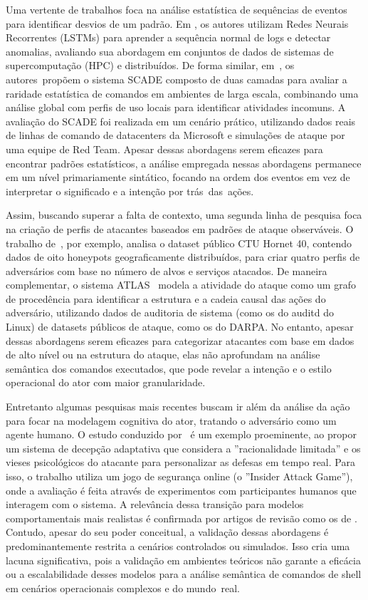 \documentclass[12pt]{article}
\begin{document}
Uma vertente de trabalhos foca na análise estatística de sequências de eventos para identificar desvios de um padrão. Em \cite{du2017deeplog}, os autores utilizam Redes Neurais Recorrentes (LSTMs) para aprender a sequência normal de logs e detectar anomalias, avaliando sua abordagem em conjuntos de dados de sistemas de supercomputação (HPC) e distribuídos. De forma similar, em~\cite{vinay2024scade}, os autores~propõem  o sistema SCADE composto de duas camadas para avaliar a raridade estatística de comandos em ambientes de larga escala, combinando uma análise global com perfis de uso locais para identificar atividades incomuns. 
A avaliação do SCADE foi realizada em um cenário prático, utilizando dados reais de linhas de comando de datacenters da Microsoft e simulações de ataque por uma equipe de Red Team. Apesar dessas abordagens serem eficazes para encontrar padrões estatísticos,  a análise empregada nessas abordagens permanece em um nível primariamente sintático, focando na ordem dos eventos em vez de interpretar o significado e a intenção por trás~das~ações.

Assim, buscando  superar a falta de contexto, uma segunda linha de pesquisa foca na criação de perfis de atacantes baseados em padrões de ataque observáveis. O trabalho de~\cite{veronica2023geo}, por exemplo, analisa o dataset público CTU Hornet 40, contendo dados de oito honeypots geograficamente distribuídos, para criar quatro perfis de adversários com base no número de alvos e serviços atacados. De maneira complementar, o sistema ATLAS~\cite{lashkari2022atlas} modela a atividade do ataque como um grafo de procedência para identificar a estrutura e a cadeia causal das ações do adversário, utilizando dados de auditoria de sistema (como os do auditd do Linux) de datasets públicos de ataque, como os do DARPA. 
No entanto, apesar dessas abordagens serem eficazes para categorizar atacantes com base em dados de alto nível ou na estrutura do ataque, elas não aprofundam na análise semântica dos comandos executados, que pode revelar a intenção e o estilo operacional do ator com maior granularidade.

Entretanto algumas pesquisas mais recentes buscam ir além da análise da ação para focar na modelagem cognitiva do ator, tratando o adversário como um agente humano. O estudo conduzido por~\cite{cranford2020adaptive} é um exemplo proeminente, ao propor um sistema de decepção adaptativa que considera a ''racionalidade limitada'' e os vieses psicológicos do atacante para personalizar as defesas em tempo real. Para isso, o trabalho utiliza um jogo de segurança online (o ''Insider Attack Game''), onde a avaliação é feita através de experimentos com participantes humanos que interagem com o sistema. A relevância dessa transição para modelos comportamentais mais realistas é confirmada por artigos de revisão como os de \cite{zhu2021defensive, jurisic2023behaviour}. Contudo, apesar do seu poder conceitual, a validação dessas abordagens é predominantemente restrita a cenários controlados ou simulados. Isso cria uma lacuna significativa, pois a validação em ambientes teóricos não garante a eficácia ou a escalabilidade desses modelos para a análise semântica de comandos de shell em cenários operacionais complexos e do mundo~real.
\end{document}
